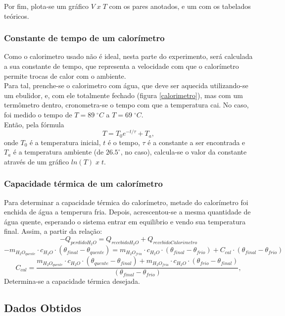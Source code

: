 \documentclass[12pt,a4paper]{article}
\begin{document}
Por fim, plota-se um gráfico $V \; x \; T$ com os pares anotados, e um com os tabelados teóricos.\\

\subsubsection{Constante de tempo de um calorímetro}

Como o calorimetro usado não é ideal, nesta parte do experimento, será calculada a sua constante de tempo, que representa a velocidade com que o calorímetro permite trocas de calor com o ambiente.\\
Para tal, prenche-se o calorimetro com água, que deve ser aquecida utilizando-se um ebulidor, e, com ele totalmente fechado (figura \ref{calorimetro}), mas com um termômetro dentro, cronometra-se o tempo com que a temperatura cai. No caso, foi medido o tempo de $T = 89 \; ^{\circ} C$ a $T = 69 \; ^{\circ} C$.\\
Então, pela fórmula 
$$T = T_0 e ^{-t/\tau} + T_a,$$
onde $T_0$ é a temperatura inicial, $t$ é o tempo, $\tau$ é a constante a ser encontrada e $T_a$ é a temperatura ambiente (de $26.5 ^{\circ}$, no caso), calcula-se o valor da constante através de um gráfico $ln(T) \; x \; t$.


\subsubsection{Capacidade térmica de um calorímetro}
Para determinar a capacidade térmica do calorímetro, metade do calorímetro foi enchida de água a temperura fria. Depois, acrescentou-se a mesma quantidade de água quente, esperando o sistema entrar em equilibrio e vendo sua temperatura final. Assim, a partir da relação:
$$-Q_{perdido H_2O} = Q_{recebido H_2O} + Q_{recebido Calorimetro}$$
$$-m_{H_2O_{quente}}\cdot c_{H_2O} \cdot (\theta_{final}-\theta_{quente}) = m_{H_2O_{fria}}\cdot c_{H_2O} \cdot (\theta_{final}-\theta_{frio}) + C_{cal}\cdot (\theta_{final}-\theta_{frio}) $$
$$C_{cal} = \frac{m_{H_2O_{quente}}\cdot c_{H_2O}\cdot(\theta_{quente} - \theta_{final}) + m_{H_2O_{fria}}\cdot c_{H_2O}\cdot(\theta_{frio} - \theta_{final})}{(\theta_{final}-\theta_{frio})},$$
Determina-se a capacidade térmica desejada.


\subsection{Dados Obtidos}
\end{document}
